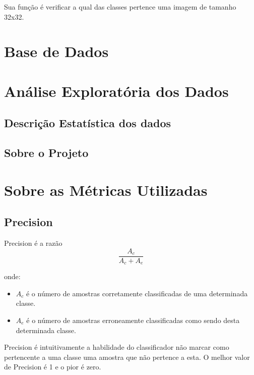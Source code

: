 \documentclass[conference]{IEEEtran}
\begin{document}
Sua função é verificar a qual das classes pertence uma imagem de tamanho 32x32.

\section{Base de Dados}





\section{Análise Exploratória dos Dados}
\subsection{Descrição Estatística dos dados}



\subsection{Sobre o Projeto}



\section{Sobre as Métricas Utilizadas}

\subsection{Precision}

Precision é a razão
    \begin{equation}
        \frac{A_c}{A_c + A_e}
    \end{equation}

    onde:

    \begin{itemize}
    \item $A_c$ é o número de amostras corretamente classificadas de uma determinada classe.
    \item $A_e$ é o número de amostras  erroneamente classificadas como sendo desta determinada classe.
    \end{itemize}

    Precision é intuitivamente a habilidade do classificador não marcar como pertencente a uma classe uma amostra que não pertence a esta. O melhor valor de Precision é 1 e o pior é zero.
    \cite{b7}
\end{document}

